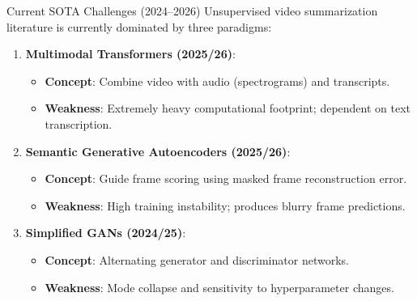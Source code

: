 \documentclass[aspectratio=169]{beamer}
\begin{document}
\begin{frame}{Current SOTA Challenges (2024--2026)}
    Unsupervised video summarization literature is currently dominated by three paradigms:
    \begin{enumerate}
        \item \textbf{Multimodal Transformers (2025/26)}:
        \begin{itemize}
            \item \textbf{Concept}: Combine video with audio (spectrograms) and transcripts.
            \item \textbf{Weakness}: Extremely heavy computational footprint; dependent on text transcription.
        \end{itemize}
        \item \textbf{Semantic Generative Autoencoders (2025/26)}:
        \begin{itemize}
            \item \textbf{Concept}: Guide frame scoring using masked frame reconstruction error.
            \item \textbf{Weakness}: High training instability; produces blurry frame predictions.
        \end{itemize}
        \item \textbf{Simplified GANs (2024/25)}:
        \begin{itemize}
            \item \textbf{Concept}: Alternating generator and discriminator networks.
            \item \textbf{Weakness}: Mode collapse and sensitivity to hyperparameter changes.
        \end{itemize}
    \end{enumerate}
\end{frame}
\end{document}
